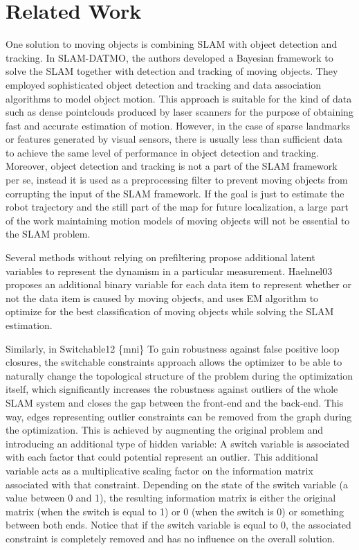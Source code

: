 \section{Related Work}

One solution to moving objects is combining SLAM with object detection and
tracking. In SLAM-DATMO, the authors developed a Bayesian framework to solve
the SLAM together with detection and tracking of moving objects. They employed
sophisticated object detection and tracking and data association algorithms to
model object motion. This approach is suitable for the kind of data such as
dense pointclouds produced by laser scanners for the purpose of obtaining fast
and accurate estimation of motion. However, in the case of sparse landmarks or
features generated by visual sensors, there is usually less than sufficient
data to achieve the same level of performance in object detection and tracking.
Moreover, object detection and tracking is not a part of the SLAM framework per
se, instead it is used as a preprocessing filter to prevent moving objects from
corrupting the input of the SLAM framework. If the goal is just to estimate the
robot trajectory and the still part of the map for future localization, a large
part of the work maintaining motion models of moving objects will not be
essential to the SLAM problem.

Several methods without relying on prefiltering propose additional latent
variables to represent the dynamism in a particular measurement.  Haehnel03
proposes an additional binary variable for each data item to represent whether
or not the data item is caused by moving objects, and uses EM algorithm to
optimize for the best classification of moving objects while solving the SLAM
estimation. 

Similarly, in Switchable12
\{mni\} To gain robustness against false positive loop closures, the
switchable constraints approach allows the optimizer to be able to naturally
change the topological structure of the problem during the optimization
itself, which significantly increases the robustness against outliers of the
whole SLAM system and closes the gap between the front-end and the back-end.
This way, edges representing outlier constraints can be removed from the graph
during the optimization. This is achieved by augmenting the original problem
and introducing an additional type of hidden variable: A switch variable is
associated with each factor that could potential represent an outlier. This
additional variable acts as a multiplicative scaling factor on the information
matrix associated with that constraint. Depending on the state of the switch
variable (a value between 0 and 1), the resulting information matrix is either
the original matrix (when the switch is equal to 1) or 0 (when the switch is
0) or something between both ends. Notice that if the switch variable is equal
to 0, the associated constraint is completely removed and has no influence on
the overall solution. 

